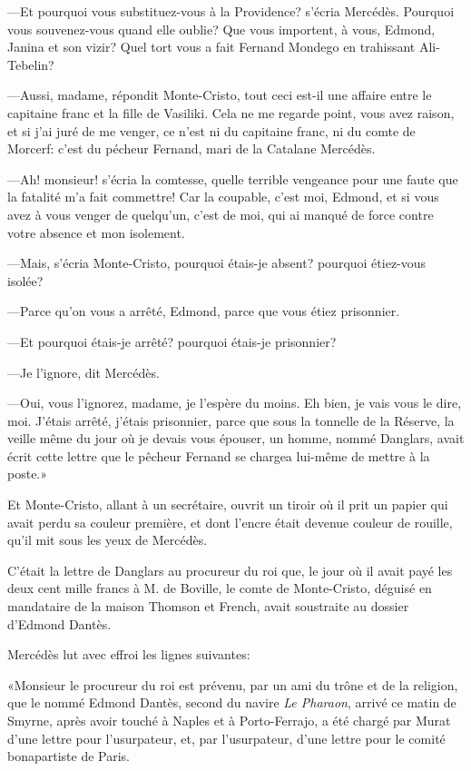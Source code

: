 —Et pourquoi vous substituez-vous à la Providence? s'écria Mercédès. Pourquoi vous souvenez-vous quand elle oublie? Que vous importent, à vous, Edmond, Janina et son vizir? Quel tort vous a fait Fernand Mondego en trahissant Ali-Tebelin? 

—Aussi, madame, répondit Monte-Cristo, tout ceci est-il une affaire entre le capitaine franc et la fille de Vasiliki. Cela ne me regarde point, vous avez raison, et si j'ai juré de me venger, ce n'est ni du capitaine franc, ni du comte de Morcerf: c'est du pécheur Fernand, mari de la Catalane Mercédès. 

—Ah! monsieur! s'écria la comtesse, quelle terrible vengeance pour une faute que la fatalité m'a fait commettre! Car la coupable, c'est moi, Edmond, et si vous avez à vous venger de quelqu'un, c'est de moi, qui ai manqué de force contre votre absence et mon isolement. 

—Mais, s'écria Monte-Cristo, pourquoi étais-je absent? pourquoi étiez-vous isolée? 

—Parce qu'on vous a arrêté, Edmond, parce que vous étiez prisonnier. 

—Et pourquoi étais-je arrêté? pourquoi étais-je prisonnier? 

—Je l'ignore, dit Mercédès. 

—Oui, vous l'ignorez, madame, je l'espère du moins. Eh bien, je vais vous le dire, moi. J'étais arrêté, j'étais prisonnier, parce que sous la tonnelle de la Réserve, la veille même du jour où je devais vous épouser, un homme, nommé Danglars, avait écrit cette lettre que le pêcheur Fernand se chargea lui-même de mettre à la poste.» 

Et Monte-Cristo, allant à un secrétaire, ouvrit un tiroir où il prit un papier qui avait perdu sa couleur première, et dont l'encre était devenue couleur de rouille, qu'il mit sous les yeux de Mercédès. 

C'était la lettre de Danglars au procureur du roi que, le jour où il avait payé les deux cent mille francs à M. de Boville, le comte de Monte-Cristo, déguisé en mandataire de la maison Thomson et French, avait soustraite au dossier d'Edmond Dantès. 

Mercédès lut avec effroi les lignes suivantes: 

«Monsieur le procureur du roi est prévenu, par un ami du trône et de la religion, que le nommé Edmond Dantès, second du navire \textit{Le Pharaon}, arrivé ce matin de Smyrne, après avoir touché à Naples et à Porto-Ferrajo, a été chargé par Murat d'une lettre pour l'usurpateur, et, par l'usurpateur, d'une lettre pour le comité bonapartiste de Paris. 

